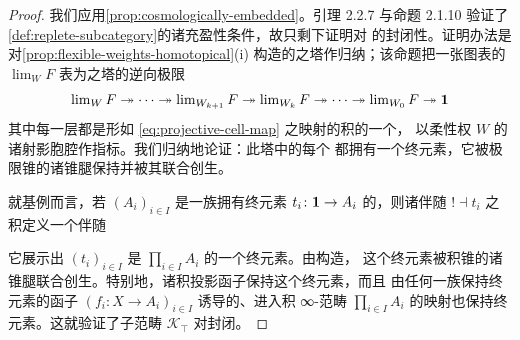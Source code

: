 \begin{proof}
我们应用\cref{prop:cosmologically-embedded}。引理 2.2.7 与命题 2.1.10 验证了
\cref{def:replete-subcategory}的诸充盈性条件，故只剩下证明对%
\trFlexibleWeightedLimit{}的封闭性。证明办法是对\cref{prop:flexible-weights-homotopical}(i)
构造的\trIsofibration{}之塔作归纳；该命题把一张图表的\trFlexibleWeightedLimit{}
$\lim_{W}F$ 表为\trIsofibration{}之塔的逆向极限
\begin{equation*}
\lim\nolimits_{W}F
\twoheadrightarrow\cdots
\twoheadrightarrow\lim\nolimits_{W_{k+1}}F
\twoheadrightarrow\lim\nolimits_{W_{k}}F
\twoheadrightarrow\cdots
\twoheadrightarrow\lim\nolimits_{W_{0}}F
\twoheadrightarrow\mathbf{1}
\end{equation*}
其中每一层都是形如 \eqref{eq:projective-cell-map} 之映射的积的一个\trPullback{}，
以柔性权 $W$ 的诸射影胞腔作指标。我们归纳地论证：此塔中的每个%
\trInfinityCategory{}都拥有一个终元素，它被极限锥的诸锥腿保持并被其联合创生。

就基例而言，若 $(A_{i})_{i\in I}$ 是一族拥有终元素
$t_{i}\colon\mathbf{1}\to A_{i}$ 的\trInfinityCategory{}，则诸伴随 $!\dashv t_{i}$
之积定义一个伴随
\begin{center}
\end{center}
它展示出 $(t_{i})_{i\in I}$ 是 $\prod_{i\in I}A_{i}$ 的一个终元素。由构造，
这个终元素被积锥的诸锥腿联合创生。特别地，诸积投影函子保持这个终元素，而且
由任何一族保持终元素的函子 $(f_{i}\colon X\to A_{i})_{i\in I}$ 诱导的、进入积
∞-范畴 $\prod_{i\in I}A_{i}$ 的映射也保持终元素。这就验证了子范畴
$\mathcal{K}_{\top}$ 对\trProduct{}封闭。


\end{proof}
